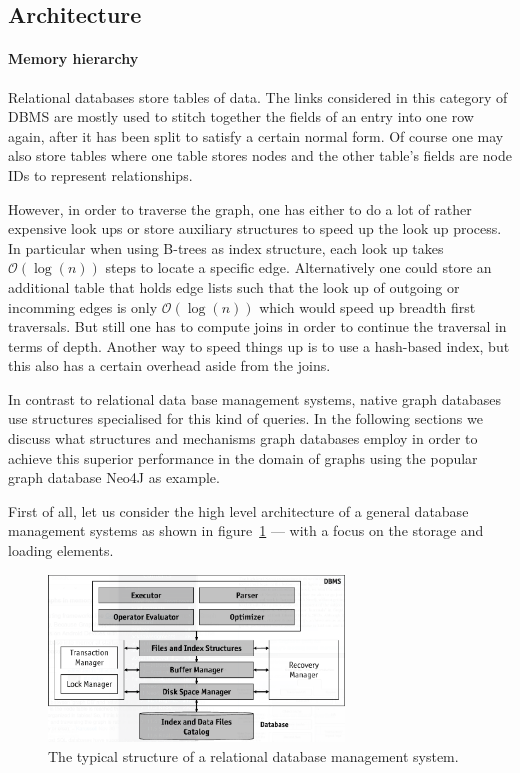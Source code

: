     \subsection{Architecture}\label{\positionnumber}
            \paragraph{Memory hierarchy}
        Relational databases store tables of data.
        The links considered in this category of DBMS are mostly used to stitch together the fields of an entry into one row again, after it has been split to satisfy a certain normal form.
        Of course one may also store tables where one table stores nodes and the other table's fields are node IDs to represent relationships.

        However, in order to traverse the graph, one has either to do a lot of rather expensive look ups or store auxiliary structures to speed up the look up process.
        In particular when using B-trees as index structure, each look up takes $\mathcal{O}(\log(n))$ steps to locate a specific edge.
        Alternatively one could store an additional table that holds edge lists such that the look up of outgoing or incomming edges is only $\mathcal{O}(\log(n))$ which would speed up breadth first traversals.
        But still one has to compute joins in order to continue the traversal in terms of depth.
        Another way to speed things up is to use a hash-based index, but this also has a certain overhead aside from the joins.

        In contrast to relational data base management systems, native graph databases use structures specialised for this kind of queries.
        In the following sections we discuss what structures and mechanisms graph databases employ in order to achieve this superior performance in the domain of graphs using the popular graph database Neo4J as example.

        First of all, let us consider the high level architecture of a general database management systems as shown in figure~\ref{dbms_arch} --- with a focus on the storage and loading elements.

        \begin{figure}[htp]\label{dbms_arch}
        \begin{center}
        \includegraphics[keepaspectratio,width=0.7\textwidth]{img/00_intro/RDBMS.png}
        \end{center}
        \caption{The typical structure of a relational database management system.} %
        \end{figure}

